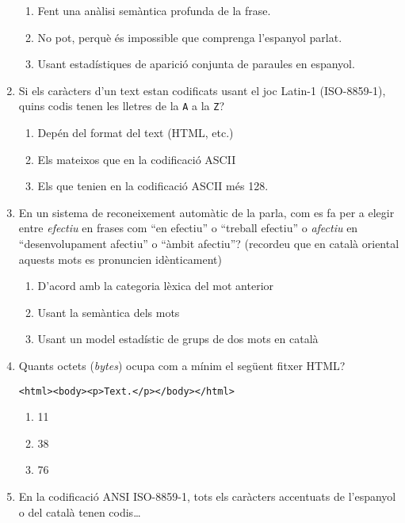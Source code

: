 \begin{enumerate}
\begin{enumerate}
\item Fent una anàlisi semàntica profunda de la frase.
\item No pot, perquè és impossible que comprenga l'espanyol parlat.
\item Usant estadístiques de aparició conjunta de paraules
      en espanyol.
\end{enumerate}

\item 
   Si els caràcters d'un text estan codificats usant el joc Latin-1
   (ISO-8859-1), quins codis tenen les lletres de la \verb|A| a
   la \verb|Z|?
   
\begin{enumerate}
\item Depén del format del text (HTML, etc.)
\item Els mateixos que en la codificació ASCII
\item Els que tenien en la codificació ASCII més 128.
\end{enumerate}

\item En un sistema de reconeixement automàtic de la parla, com es
  fa per a elegir entre \emph{efectiu} en frases com ``en efectiu''
  o ``treball efectiu'' o \emph{afectiu} en ``desenvolupament
  afectiu'' o ``àmbit afectiu''? (recordeu que en català oriental
  aquests mots es pronuncien idènticament)
  
\begin{enumerate}
\item D'acord amb la categoria lèxica del mot anterior
\item Usant la semàntica dels mots
\item Usant un model estadístic de grups de dos mots en català
\end{enumerate}

\item 
   Quants octets (\emph{bytes}) ocupa com a mínim el següent fitxer HTML?
   \begin{center}
   \verb|<html><body><p>Text.</p></body></html>|
   \end{center}
   
\begin{enumerate}
\item 11
\item 38
\item 76
\end{enumerate}

\item En la codificació ANSI ISO-8859-1, tots els caràcters
   accentuats  de l'espanyol o del català tenen codis{\ldots}
   

\end{enumerate}

